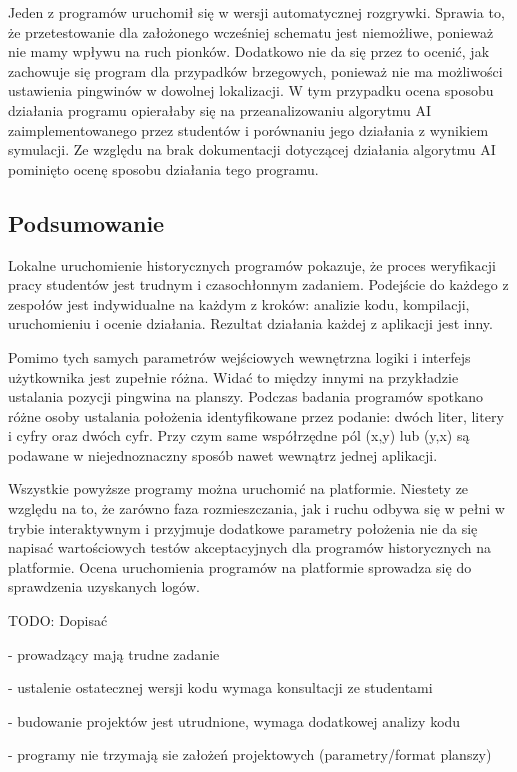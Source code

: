 Jeden z programów uruchomił się w wersji automatycznej rozgrywki.
Sprawia to, że przetestowanie dla założonego wcześniej schematu jest niemożliwe, ponieważ nie mamy wpływu na ruch pionków.
Dodatkowo nie da się przez to ocenić, jak zachowuje się program dla przypadków brzegowych, ponieważ nie ma możliwości ustawienia pingwinów w dowolnej lokalizacji.
W tym przypadku ocena sposobu działania programu opierałaby się na przeanalizowaniu algorytmu AI zaimplementowanego przez studentów i porównaniu jego działania z wynikiem symulacji.
Ze względu na brak dokumentacji dotyczącej działania algorytmu AI pominięto ocenę sposobu działania tego programu.

\subsection{Podsumowanie}

Lokalne uruchomienie historycznych programów pokazuje, że proces weryfikacji pracy studentów jest trudnym i czasochłonnym zadaniem.
Podejście do każdego z zespołów jest indywidualne na każdym z kroków: analizie kodu, kompilacji, uruchomieniu i ocenie działania.
Rezultat działania każdej z aplikacji jest inny.

Pomimo tych samych parametrów wejściowych wewnętrzna logiki i interfejs użytkownika jest zupełnie różna.
Widać to między innymi na przykładzie ustalania pozycji pingwina na planszy.
Podczas badania programów spotkano różne osoby ustalania położenia identyfikowane przez podanie: dwóch liter, litery i cyfry oraz dwóch cyfr.
Przy czym same współrzędne pól (x,y) lub (y,x) są podawane w niejednoznaczny sposób nawet wewnątrz jednej aplikacji.

Wszystkie powyższe programy można uruchomić na platformie.
Niestety ze względu na to, że zarówno faza rozmieszczania, jak i ruchu odbywa się w pełni w trybie interaktywnym i przyjmuje dodatkowe parametry położenia nie da się napisać wartościowych testów akceptacyjnych dla programów historycznych na platformie.
Ocena uruchomienia programów na platformie sprowadza się do sprawdzenia uzyskanych logów.

TODO: Dopisać

- prowadzący mają trudne zadanie

- ustalenie ostatecznej wersji kodu wymaga konsultacji ze studentami

- budowanie projektów jest utrudnione, wymaga dodatkowej analizy kodu

- programy nie trzymają sie założeń projektowych (parametry/format planszy)

